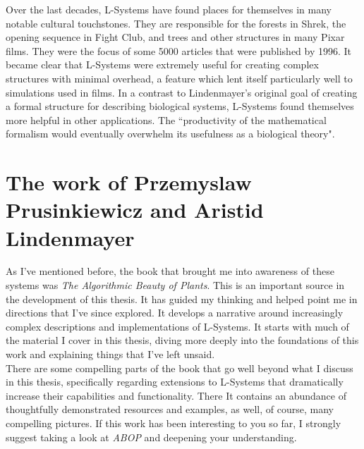 \documentclass[12pt,twoside]{reedthesis}
\begin{document}
	Over the last decades, L-Systems have found places for themselves in many notable cultural touchstones. They are responsible for the forests in Shrek, the opening sequence in Fight Club, and trees and other structures in many Pixar films. They were the focus of some 5000 articles that were published by 1996. It became clear that L-Systems were extremely useful for creating complex structures with minimal overhead, a feature which lent itself particularly well to simulations used in films. In a contrast to Lindenmayer's original goal of creating a formal structure for describing biological systems, L-Systems found themselves more helpful in other applications. The ``productivity of the mathematical formalism would eventually overwhelm its usefulness as a biological theory".\\
	
	
	


\section{The work of Przemyslaw Prusinkiewicz and Aristid Lindenmayer}
	
	As I've mentioned before, the book that brought me into awareness of these systems was \textit{The Algorithmic Beauty of Plants}. This is an important source in the development of this thesis. It has guided my thinking and helped point me in directions that I've since explored. It develops a narrative around increasingly complex descriptions and implementations of L-Systems. It starts with much of the material I cover in this thesis, diving more deeply into the foundations of this work and explaining things that I've left unsaid.\\
	
	There are some compelling parts of the book that go well beyond what I discuss in this thesis, specifically regarding extensions to L-Systems that dramatically increase their capabilities and functionality. There It contains an abundance of thoughtfully demonstrated resources and examples, as well, of course, many compelling pictures. If this work has been interesting to you so far, I strongly suggest taking a look at \textit{ABOP} and deepening your understanding.\\
	
\end{document}
